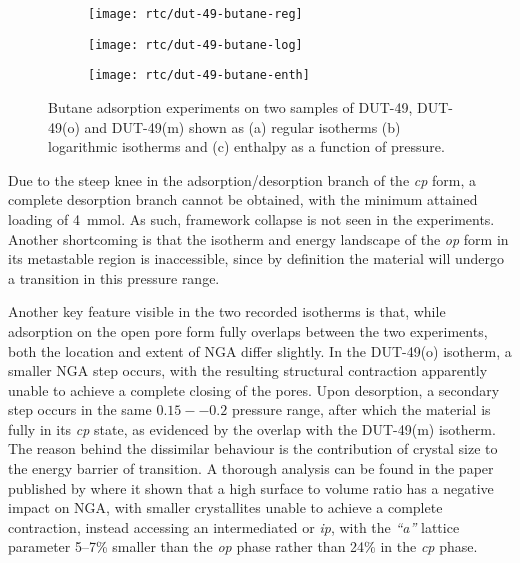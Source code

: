 \begin{figure}[htb]
    \centering
    \begin{subfigure}{0.33\linewidth}
        \texttt{[image: rtc/dut-49-butane-reg]}%
        \caption{}\label{dut:fgr:dut-49-butane-reg}
    \end{subfigure}%
    \begin{subfigure}{0.33\linewidth}
        \texttt{[image: rtc/dut-49-butane-log]}%
        \caption{}\label{dut:fgr:dut-49-butane-log}
    \end{subfigure}%
    \begin{subfigure}{0.33\linewidth}
        \texttt{[image: rtc/dut-49-butane-enth]}%
        \caption{}\label{dut:fgr:dut-49-butane-enth}
    \end{subfigure}%
    \caption{Butane adsorption experiments on two samples of 
    DUT-49, DUT-49(o) and DUT-49(m) shown as (a) regular 
    isotherms (b) logarithmic isotherms 
    and (c) enthalpy as a function of pressure.}%
    \label{dut:fgr:dut-49-butane}
\end{figure}

Due to the steep knee in the adsorption/desorption branch of the 
\textit{cp} form, a complete desorption branch cannot be obtained,
with the minimum attained loading of \SI{4}{\milli\mol}. As such,
framework collapse is not seen in the experiments. Another 
shortcoming is that the isotherm
and energy landscape of the \textit{op} form in its metastable 
region is inaccessible, since by definition the material will 
undergo a transition in this pressure range.

Another key feature visible in the two recorded isotherms is that,
while adsorption on the open pore form fully overlaps between the 
two experiments, both the location and extent of NGA differ 
slightly. In the DUT-49(o) isotherm, a smaller NGA step occurs,
with the resulting structural contraction apparently unable to 
achieve a complete closing of the pores. Upon desorption, a 
secondary step occurs in the same \(0.15--0.2\) pressure range,
after which the material is fully in its \textit{cp} state,
as evidenced by the overlap with the DUT-49(m) isotherm. The 
reason behind the dissimilar behaviour is the contribution
of crystal size to the energy barrier of transition. A thorough
analysis can be found in the paper published 
by \citet{krauseEffectCrystalliteSize2018} where it shown that 
a high surface to volume ratio has a negative impact on NGA, with 
smaller crystallites unable to achieve a complete contraction,
instead accessing an intermediated or \textit{ip}, with the \textit{``a''}
lattice parameter 5--7\% smaller than the \textit{op} phase
rather than 24\% in the \textit{cp} phase.

